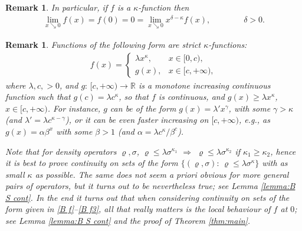 \documentclass[unsortedaddress,superscriptaddress,pra,notitlepage]{revtex4}
\newtheorem{rem}[definition]{Remark}
\def\bR{\mathbb{R}}
\def\rho{\varrho}
\def\imp{\Longrightarrow}
\def\pwr{\kappa}
\newcommand{\ds}{\mbox{ }\mbox{ }}
\begin{document}
\begin{rem}\label{rem:zero limit}
In particular, 
if $f$ is a $\pwr$-function then 
\begin{align}\label{zero limit}
\lim_{x\searrow 0}f(x)=f(0)=0=\lim_{x\searrow 0}x^{\delta-\pwr}f(x),\ds\ds\ds\delta>0.
\end{align}
\end{rem}

\begin{rem}
Functions of the following form are strict $\pwr$-functions:
\begin{align}\label{power function}
f(x)=
\begin{cases}
\lambda x^{\pwr},&x\in[0,c),\\
g(x),&x\in[c,+\infty),
\end{cases}
\end{align}
where $\lambda,c,>0$, and $g:\,[c,+\infty)\to\bR$ is a monotone increasing continuous function such that $g(c)=\lambda c^{\kappa}$, so that $f$ is continuous, and $g(x)\ge\lambda x^{\pwr}$, $x\in[c,+\infty)$.
For instance, $g$ can be of the form $g(x)=\lambda'x^{\gamma}$, with some $\gamma>\pwr$
(and $\lambda'= \lambda c^{\pwr-\gamma}$), or it can be even faster increasing on $[c,+\infty)$, e.g., as $g(x)=\alpha\beta^x$ with some $\beta>1$ (and $\alpha=\lambda c^{\pwr}/\beta^c$). 

Note that for density operators $\rho,\sigma$, 
$\rho\le\lambda\sigma^{\pwr_1}$ $\imp$ $\rho\le\lambda\sigma^{\pwr_2}$
if $\kappa_1\ge\kappa_2$, hence it is best to prove continuity on sets of the form
$\{(\rho,\sigma):\,\rho\le\lambda\sigma^{\pwr}\}$ with as small $\pwr$ as possible. 
The same does not seem a priori obvious for more general pairs of operators, but it turns out to be nevertheless true; see Lemma \ref{lemma:B S cont}.
In the end it turns out that when considering continuity on sets of the form 
given in \eqref{B f}--\eqref{B f3}, all that really matters is the local behaviour of 
$f$ at $0$; see Lemma \ref{lemma:B S cont} and 
the proof of Theorem \ref{thm:main}.
\end{rem}
\end{document}
